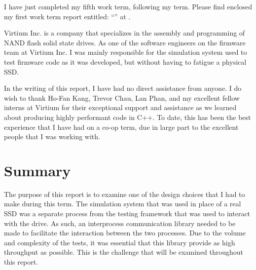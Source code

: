 \documentclass[se]{uw-wkrpt}
\begin{document}
\begin{letter}
I have just completed my fifth work term, following my \theterm{} term.
Please find enclosed my first work term report entitled:
``\thetitle'' at \theemployer.  

Virtium Inc. is a company that specializes in the assembly and programming of
NAND flash solid state drives. As one of the software engineers on the 
firmware team at Virtium Inc. I was mainly responsible for the simulation 
system used to test firmware code as it was developed, but without having 
to fatigue a physical SSD.

In the writing of this report, I have had no direct assistance from anyone. 
I do wish to thank Ho-Fan Kang, Trevor Chau, Lan Phan, and my excellent fellow
interns at Virtium for their exceptional support and assistance as we learned
about producing highly performant code in C++. To date, this has been the best
experience that I have had on a co-op term, due in large part to the excellent
people that I was working with.

\end{letter}

\tableofcontents
\listoffigures

\section{Summary}

The purpose of this report is to examine one of the design choices that I
had to make during this term. The simulation system that was used in place
of a real SSD was a separate process from the testing framework that was
used to interact with the drive. As such, an interprocess communication
library needed to be made to facilitate the interaction between the two processes.
Due to the volume and complexity of the tests, it was essential that this
library provide as high throughput as possible. This is the challenge that will
be examined throughout this report.
\end{document}
